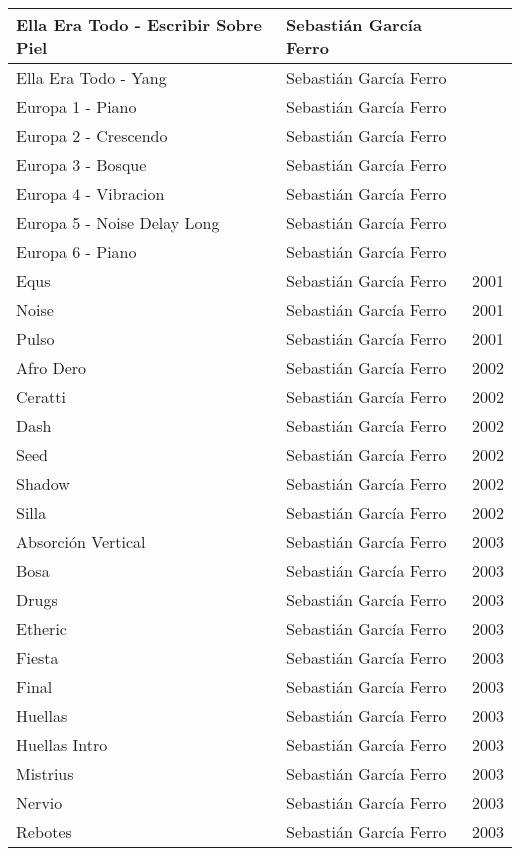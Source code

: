 \begin{center}
\begin{longtable}{| p{} | p{} | p{} |}
Ella Era Todo - Escribir Sobre Piel & Sebastián García Ferro &  \\ \hline 
Ella Era Todo - Yang & Sebastián García Ferro &  \\ \hline 
Europa 1 - Piano & Sebastián García Ferro &  \\ \hline 
Europa 2 - Crescendo & Sebastián García Ferro &  \\ \hline 
Europa 3 - Bosque & Sebastián García Ferro &  \\ \hline 
Europa 4 - Vibracion & Sebastián García Ferro &  \\ \hline 
Europa 5 - Noise Delay Long & Sebastián García Ferro &  \\ \hline 
Europa 6 - Piano & Sebastián García Ferro &  \\ \hline 
Equs & Sebastián García Ferro & 2001 \\ \hline 
Noise & Sebastián García Ferro & 2001 \\ \hline 
Pulso & Sebastián García Ferro & 2001 \\ \hline 
Afro Dero & Sebastián García Ferro & 2002 \\ \hline 
Ceratti & Sebastián García Ferro & 2002 \\ \hline 
Dash & Sebastián García Ferro & 2002 \\ \hline 
Seed & Sebastián García Ferro & 2002 \\ \hline 
Shadow & Sebastián García Ferro & 2002 \\ \hline 
Silla & Sebastián García Ferro & 2002 \\ \hline 
Absorción Vertical & Sebastián García Ferro & 2003 \\ \hline 
Bosa & Sebastián García Ferro & 2003 \\ \hline 
Drugs & Sebastián García Ferro & 2003 \\ \hline 
Etheric & Sebastián García Ferro & 2003 \\ \hline 
Fiesta & Sebastián García Ferro & 2003 \\ \hline 
Final & Sebastián García Ferro & 2003 \\ \hline 
Huellas & Sebastián García Ferro & 2003 \\ \hline 
Huellas Intro & Sebastián García Ferro & 2003 \\ \hline 
Mistrius & Sebastián García Ferro & 2003 \\ \hline 
Nervio & Sebastián García Ferro & 2003 \\ \hline 
Rebotes & Sebastián García Ferro & 2003 \\ \hline 

\end{longtable}
\end{center}
